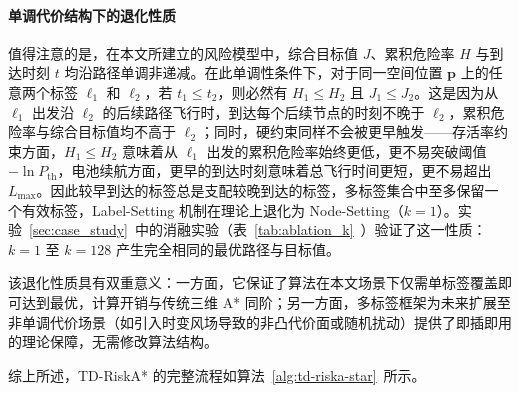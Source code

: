 \paragraph{单调代价结构下的退化性质}
值得注意的是，在本文所建立的风险模型中，综合目标值 $J$、累积危险率 $H$ 与到达时刻 $t$ 均沿路径单调非递减。在此单调性条件下，对于同一空间位置 $\mathbf{p}$ 上的任意两个标签 $\ell_1$ 和 $\ell_2$，若 $t_1 \leq t_2$，则必然有 $H_1 \leq H_2$ 且 $J_1 \leq J_2$。这是因为从 $\ell_1$ 出发沿 $\ell_2$ 的后续路径飞行时，到达每个后续节点的时刻不晚于 $\ell_2$，累积危险率与综合目标值均不高于 $\ell_2$；同时，硬约束同样不会被更早触发——存活率约束方面，$H_1 \leq H_2$ 意味着从 $\ell_1$ 出发的累积危险率始终更低，更不易突破阈值 $-\ln P_{\mathrm{th}}$，电池续航方面，更早的到达时刻意味着总飞行时间更短，更不易超出 $L_{\max}$。因此较早到达的标签总是支配较晚到达的标签，多标签集合中至多保留一个有效标签，Label-Setting 机制在理论上退化为 Node-Setting（$k=1$）。实验~\ref{sec:case_study}~中的消融实验（表~\ref{tab:ablation_k}~）验证了这一性质：$k=1$ 至 $k=128$ 产生完全相同的最优路径与目标值。

该退化性质具有双重意义：一方面，它保证了算法在本文场景下仅需单标签覆盖即可达到最优，计算开销与传统三维 A* 同阶；另一方面，多标签框架为未来扩展至非单调代价场景（如引入时变风场导致的非凸代价面或随机扰动）提供了即插即用的理论保障，无需修改算法结构。

综上所述，TD-RiskA* 的完整流程如算法~\ref{alg:td-riska-star}~所示。

